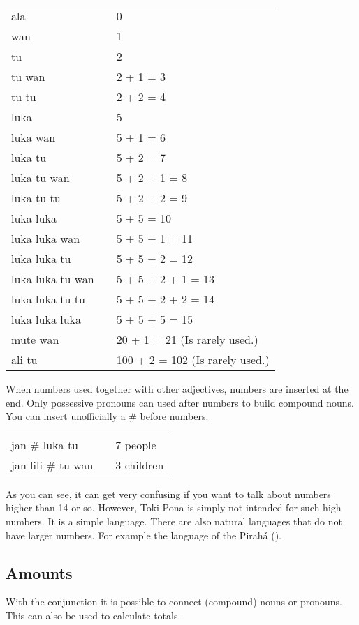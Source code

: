 \begin{supertabular}{p{5,5cm}|ll}
ala && 0 \\
wan && 1 \\ 
tu  && 2 \\ 
tu wan && 2 + 1 = 3 \\
tu tu && 2 + 2 = 4 \\
luka && 5 \\
luka wan && 5 + 1 = 6 \\
luka tu && 5 + 2 = 7 \\
luka tu wan && 5 + 2 + 1 = 8 \\
luka tu tu && 5 + 2 + 2 = 9 \\
luka luka && 5 + 5 = 10 \\
luka luka wan && 5 + 5 + 1 = 11 \\
luka luka tu && 5 + 5 + 2 = 12 \\
luka luka tu wan && 5 + 5 + 2 + 1 = 13 \\
luka luka tu tu && 5 + 5 + 2 + 2 = 14 \\
luka luka luka && 5 + 5 + 5 = 15 \\
mute wan && 20 + 1 = 21 (Is rarely used.) \\
ali tu && 100 + 2 = 102 (Is rarely used.) \\
\end{supertabular} 

When numbers used together with other adjectives, numbers are inserted at the end.
Only possessive pronouns can used after numbers to build compound nouns.
You can insert unofficially a \# before numbers. 

\begin{supertabular}{p{5,5cm}|ll}
jan \# luka tu && 7 people \\
jan lili \# tu wan && 3 children \\
\end{supertabular} 

As you can see, it can get very confusing if you want to talk about numbers higher than 14 or so.
However, Toki Pona is simply not intended for such high numbers. 
It is a simple language. 
There are also natural languages that do not have larger numbers. 
For example the language of the Pirah\'{a} (\cite{www:piraha:01}). 

%
%
\subsection*{Amounts}
%
%
With the conjunction  it is possible to connect (compound) nouns or pronouns.
This can also be used to calculate totals. 


